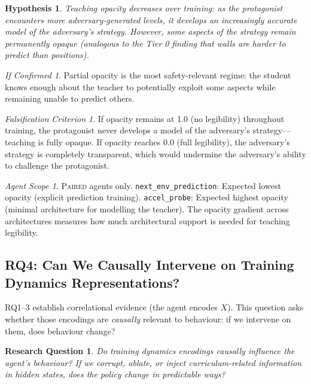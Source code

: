 \documentclass[11pt,a4paper]{article}
\newtheorem{hypothesis}{Hypothesis}[subsection]
\newtheorem{researchq}{Research Question}[subsection]
\theoremstyle{remark}
\newtheorem*{falsification}{Falsification Criterion}
\newtheorem*{implication}{If Confirmed}
\newtheorem*{agentscope}{Agent Scope}
\newcommand{\paired}{\textsc{Paired}}
\begin{document}
\begin{hypothesis}
Teaching opacity decreases over training: as the protagonist encounters more adversary-generated levels, it develops an increasingly accurate model of the adversary's strategy. However, some aspects of the strategy remain permanently opaque (analogous to the Tier 0 finding that walls are harder to predict than positions).
\end{hypothesis}

\begin{implication}
Partial opacity is the most safety-relevant regime: the student knows enough about the teacher to potentially exploit some aspects while remaining unable to predict others.
\end{implication}

\begin{falsification}
If opacity remains at 1.0 (no legibility) throughout training, the protagonist never develops a model of the adversary's strategy---teaching is fully opaque. If opacity reaches 0.0 (full legibility), the adversary's strategy is completely transparent, which would undermine the adversary's ability to challenge the protagonist.
\end{falsification}

\begin{agentscope}
\paired{} agents only. \texttt{next\_env\_prediction}: Expected lowest opacity (explicit prediction training). \texttt{accel\_probe}: Expected highest opacity (minimal architecture for modelling the teacher). The opacity gradient across architectures measures how much architectural support is needed for teaching legibility.
\end{agentscope}

\subsection{RQ4: Can We Causally Intervene on Training Dynamics Representations?}
\label{sec:rq4}

RQ1--3 establish correlational evidence (the agent encodes $X$). This question asks whether those encodings are \textit{causally} relevant to behaviour: if we intervene on them, does behaviour change?

\begin{researchq}
Do training dynamics encodings causally influence the agent's behaviour? If we corrupt, ablate, or inject curriculum-related information in hidden states, does the policy change in predictable ways?
\end{researchq}
\end{document}
